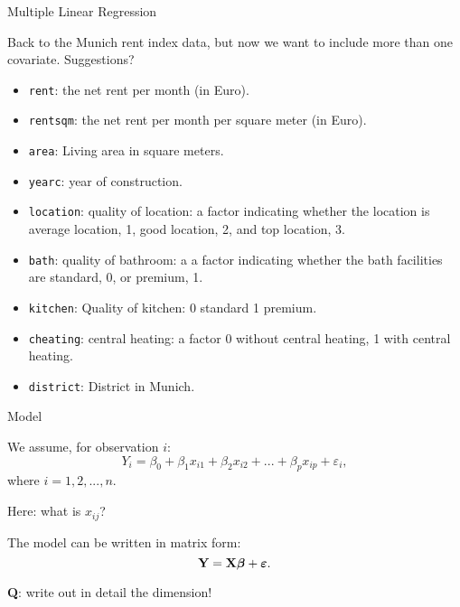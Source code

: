 \documentclass[ignorenonframetext,]{beamer}
\providecommand{\tightlist}{%
  \setlength{\itemsep}{0pt}\setlength{\parskip}{0pt}}
\begin{document}
\begin{frame}[fragile]{Multiple Linear Regression}

Back to the Munich rent index data, but now we want to include more than
one covariate. Suggestions?

\begin{itemize}
\tightlist
\item
  \texttt{rent}: the net rent per month (in Euro).
\item
  \texttt{rentsqm}: the net rent per month per square meter (in Euro).
\item
  \texttt{area}: Living area in square meters.
\item
  \texttt{yearc}: year of construction.
\item
  \texttt{location}: quality of location: a factor indicating whether
  the location is average location, 1, good location, 2, and top
  location, 3.
\item
  \texttt{bath}: quality of bathroom: a a factor indicating whether the
  bath facilities are standard, 0, or premium, 1.
\item
  \texttt{kitchen}: Quality of kitchen: 0 standard 1 premium.
\item
  \texttt{cheating}: central heating: a factor 0 without central
  heating, 1 with central heating.
\item
  \texttt{district}: District in Munich.
\end{itemize}

\end{frame}

\begin{frame}

\begin{block}{Model}

We assume, for observation \(i\):
\[Y_i= \beta_0 + \beta_{1}  x_{i1} + \beta_2 x_{i2} + ... + \beta_p x_{ip} + \varepsilon_i,\]
where \(i=1,2,...,n\).

Here: what is \(x_{ij}\)?

The model can be written in matrix form:
\[{\bf Y}={\bf X} \boldsymbol{\beta}+{\boldsymbol{\varepsilon}}.\]

\textbf{Q}: write out in detail the dimension!

\end{block}

\end{frame}
\end{document}
